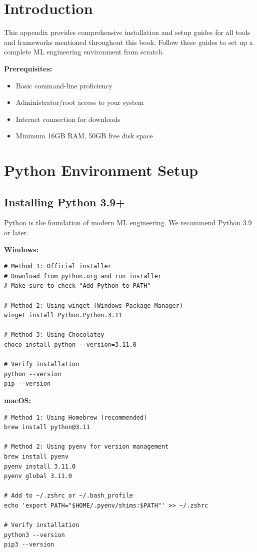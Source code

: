 \section{Introduction}

This appendix provides comprehensive installation and setup guides for all tools and frameworks mentioned throughout this book. Follow these guides to set up a complete ML engineering environment from scratch.

\textbf{Prerequisites:}
\begin{itemize}
    \item Basic command-line proficiency
    \item Administrator/root access to your system
    \item Internet connection for downloads
    \item Minimum 16GB RAM, 50GB free disk space
\end{itemize}

\section{Python Environment Setup}

\subsection{Installing Python 3.9+}

Python is the foundation of modern ML engineering. We recommend Python 3.9 or later.

\textbf{Windows:}
\begin{lstlisting}[style=shell]
# Method 1: Official installer
# Download from python.org and run installer
# Make sure to check "Add Python to PATH"

# Method 2: Using winget (Windows Package Manager)
winget install Python.Python.3.11

# Method 3: Using Chocolatey
choco install python --version=3.11.0

# Verify installation
python --version
pip --version
\end{lstlisting}

\textbf{macOS:}
\begin{lstlisting}[style=shell]
# Method 1: Using Homebrew (recommended)
brew install python@3.11

# Method 2: Using pyenv for version management
brew install pyenv
pyenv install 3.11.0
pyenv global 3.11.0

# Add to ~/.zshrc or ~/.bash_profile
echo 'export PATH="$HOME/.pyenv/shims:$PATH"' >> ~/.zshrc

# Verify installation
python3 --version
pip3 --version
\end{lstlisting}

